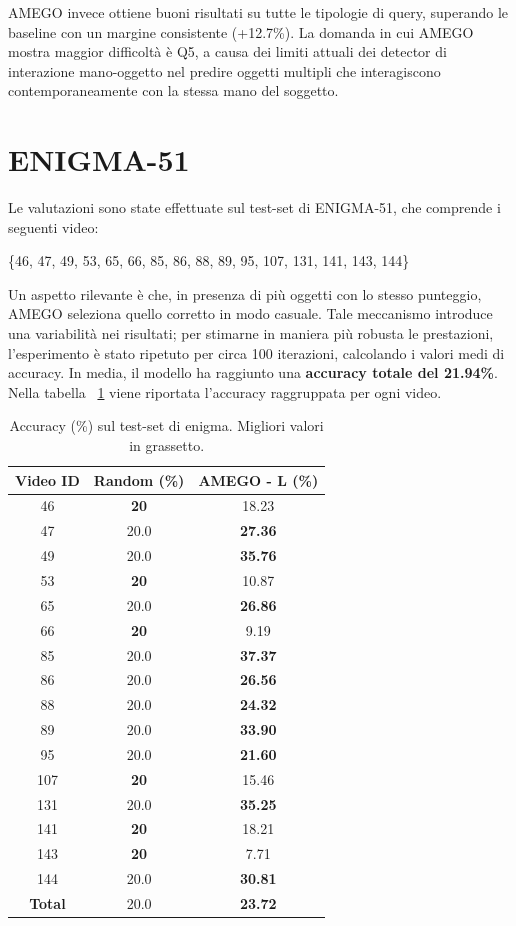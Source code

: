 AMEGO invece ottiene buoni risultati su tutte le tipologie di query, superando le baseline con un margine consistente (+12.7\%). La domanda in cui AMEGO mostra maggior difficoltà è Q5, a causa dei limiti attuali dei detector di interazione mano-oggetto nel predire oggetti multipli che interagiscono contemporaneamente con la stessa mano del soggetto.

\section{ENIGMA-51}
Le valutazioni sono state effettuate sul test-set di ENIGMA-51, che comprende i seguenti video: 

\begin{center}
    \{46, 47, 49, 53, 65, 66, 85, 86, 88, 89, 95, 107, 131, 141, 143, 144\}
\end{center}

Un aspetto rilevante è che, in presenza di più oggetti con lo stesso punteggio, AMEGO seleziona quello corretto in modo casuale. 
Tale meccanismo introduce una variabilità nei risultati; per stimarne in maniera più robusta le prestazioni, 
l'esperimento è stato ripetuto per circa 100 iterazioni, calcolando i valori medi di accuracy.
In media, il modello ha raggiunto una \textbf{accuracy totale del 21.94\%}. 
Nella tabella ~\ref{table:acc_videos} viene riportata l'accuracy raggruppata per ogni video.

\begin{table}[ht]
    \centering
    \caption{Accuracy (\%) sul test-set di enigma. Migliori valori in grassetto.}
    {\footnotesize
    \begin{tabular}{|c|c|c|} 
    \hline
    \textbf{Video ID} & \textbf{Random (\%)} & \textbf{AMEGO - L (\%)} \\
    \hline
    46  & \textbf{20} & 18.23 \\
    47  & 20.0 & \textbf{27.36} \\
    49  & 20.0 & \textbf{35.76} \\
    53  & \textbf{20} & 10.87 \\
    65  & 20.0 & \textbf{26.86} \\
    66  & \textbf{20} & 9.19 \\
    85  & 20.0 & \textbf{37.37} \\
    86  & 20.0 & \textbf{26.56} \\
    88  & 20.0 & \textbf{24.32} \\
    89  & 20.0 & \textbf{33.90} \\
    95  & 20.0 & \textbf{21.60} \\
    107 & \textbf{20} & 15.46 \\
    131 & 20.0 & \textbf{35.25} \\
    141 & \textbf{20} & 18.21 \\
    143 & \textbf{20} & 7.71 \\
    144 & 20.0 & \textbf{30.81} \\
    \hline
    \textbf{Total} & 20.0 & \textbf{23.72} \\
    \hline
    \end{tabular}%
    }
    \label{table:acc_videos}
\end{table}

